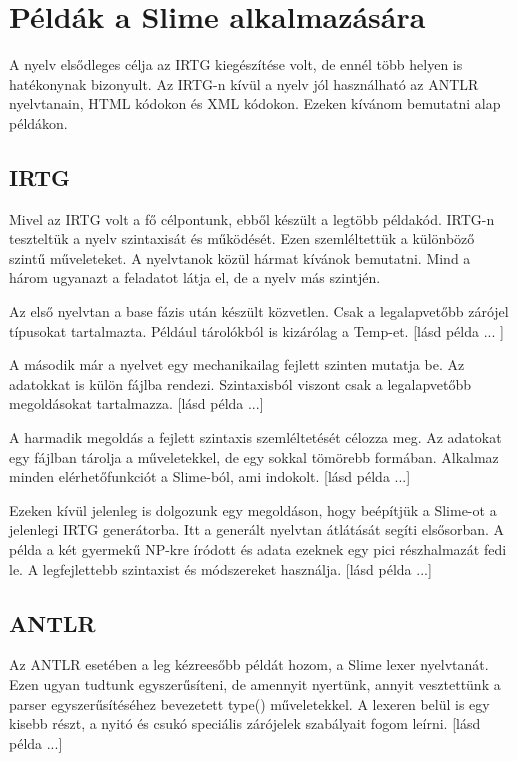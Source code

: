 {%
\section{Példák a Slime alkalmazására}
\label{sec:SExamples}

A nyelv elsődleges célja az IRTG kiegészítése volt, de ennél több helyen is hatékonynak bizonyult.
Az IRTG-n kívül a nyelv jól használható az ANTLR nyelvtanain, HTML kódokon és XML kódokon.
Ezeken kívánom bemutatni alap példákon.


\subsection{IRTG}
\label{sec:SEIRTG}
Mivel az IRTG volt a fő célpontunk, ebből készült a legtöbb példakód.
IRTG-n teszteltük a nyelv szintaxisát és működését.
Ezen szemléltettük a különböző szintű műveleteket.
A nyelvtanok közül hármat kívánok bemutatni.
Mind a három ugyanazt a feladatot látja el, de a nyelv más szintjén.

Az első nyelvtan a base fázis után készült közvetlen.
Csak a legalapvetőbb zárójel típusokat tartalmazta.
Például tárolókból is kizárólag a Temp-et.
[lásd példa ... ]

A második már a nyelvet egy mechanikailag fejlett szinten mutatja be.
Az adatokkat is külön fájlba rendezi.
Szintaxisból viszont csak a legalapvetőbb megoldásokat tartalmazza.
[lásd példa ...]

A harmadik megoldás a fejlett szintaxis szemléltetését célozza meg.
Az adatokat egy fájlban tárolja a műveletekkel, de egy sokkal tömörebb formában.
Alkalmaz minden elérhetőfunkciót a Slime-ból, ami indokolt.
[lásd példa ...]

Ezeken kívül jelenleg is dolgozunk egy megoldáson, hogy beépítjük a Slime-ot a jelenlegi IRTG generátorba.
Itt a generált nyelvtan átlátását segíti elsősorban.
A példa a két gyermekű NP-kre íródott és adata ezeknek egy pici részhalmazát fedi le.
A legfejlettebb szintaxist és módszereket használja.
[lásd példa ...]

\subsection{ANTLR}
\label{sec:SEANTLR}
Az ANTLR esetében a leg kézreesőbb példát hozom, a Slime lexer nyelvtanát. 
Ezen ugyan tudtunk egyszerűsíteni, de amennyit nyertünk, annyit vesztettünk a parser egyszerűsítéséhez bevezetett type() műveletekkel.
A lexeren belül is egy kisebb részt, a nyitó és csukó speciális zárójelek szabályait fogom leírni.
[lásd példa ...]

}
